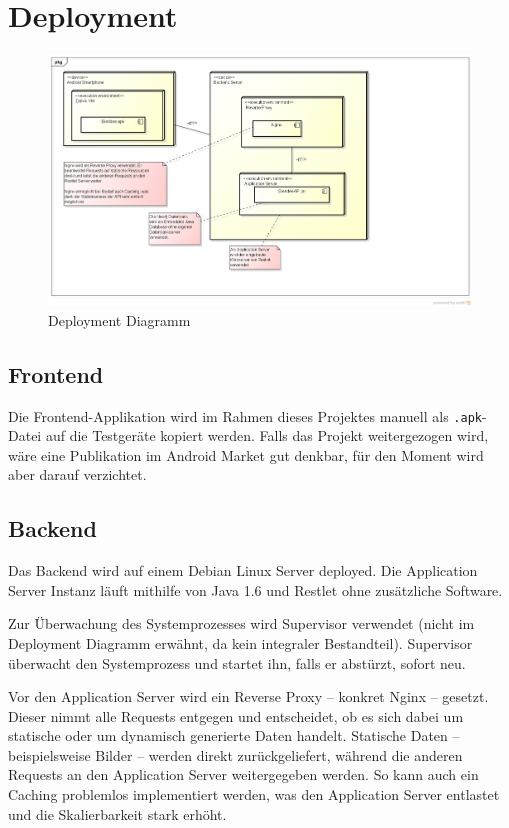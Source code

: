 \documentclass[10pt,a4paper]{scrartcl}
\begin{document}
\section{Deployment}

\begin{figure}[H]
	\includegraphics[width=\textwidth]{DeploymentDiagram.png}
	\caption{Deployment Diagramm}
	\label{fig:deployment_diagram}
\end{figure}

\subsection{Frontend}

Die Frontend-Applikation wird im Rahmen dieses Projektes manuell als \texttt{.apk}-Datei auf die
Testgeräte kopiert werden. Falls das Projekt weitergezogen wird, wäre eine Publikation im Android
Market gut denkbar, für den Moment wird aber darauf verzichtet.


\subsection{Backend}

Das Backend wird auf einem Debian Linux Server deployed. Die Application Server Instanz läuft
mithilfe von Java 1.6 und Restlet ohne zusätzliche Software.

Zur Überwachung des Systemprozesses
wird Supervisor verwendet (nicht im Deployment Diagramm erwähnt, da kein integraler Bestandteil).
Supervisor überwacht den Systemprozess und startet ihn, falls er abstürzt, sofort neu. 

Vor den Application Server wird ein Reverse Proxy -- konkret Nginx -- gesetzt. Dieser nimmt alle
Requests entgegen und entscheidet, ob es sich dabei um statische oder um dynamisch generierte Daten
handelt. Statische Daten -- beispielsweise Bilder -- werden direkt zurückgeliefert, während
die anderen Requests an den Application Server weitergegeben werden. So kann auch ein Caching
problemlos implementiert werden, was den Application Server entlastet und die Skalierbarkeit stark
erhöht.
\end{document}
